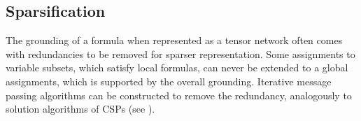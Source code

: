 


\subsection{Sparsification}


The grounding of a formula when represented as a tensor network often comes with redundancies to be removed for sparser representation.
Some assignments to variable subsets, which satisfy local formulas, can never be extended to a global assignments, which is supported by the overall grounding.
Iterative message passing algorithms can be constructed to remove the redundancy, analogously to solution algorithms of CSPs (see ).



